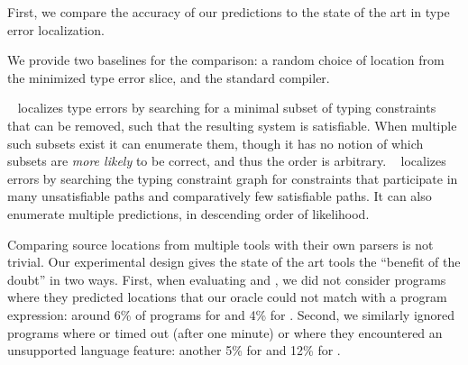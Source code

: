 \label{sec:nate:quantitative}

First, we compare the accuracy of our predictions to the
state of the art in type error localization.

We provide two baselines for the comparison: a random choice of location
from the minimized type error slice, and the standard \ocaml compiler.

\mycroft~\citep{Loncaric2016-uk} localizes type errors by searching for
a minimal subset of typing constraints that can be removed, such that
the resulting system is satisfiable.
%
When multiple such subsets exist it can enumerate them, though it has no
notion of which subsets are \emph{more likely} to be correct, and thus
the order is arbitrary.
%
\sherrloc~\citep{Zhang2014-lv} localizes errors by searching the typing
constraint graph for constraints that participate in many unsatisfiable
paths and comparatively few satisfiable paths.
%
It can also enumerate multiple predictions, in descending order of
likelihood.

Comparing source locations from multiple tools with their own parsers is
not trivial.
%
Our experimental design gives the state of the art tools the ``benefit
of the doubt'' in two ways.
First, when evaluating \mycroft and \sherrloc, we did not consider
programs where they predicted locations that our oracle could not match
with a program expression: around 6\% of programs for \mycroft and 4\%
for \sherrloc.
%
Second, we similarly ignored programs where \mycroft or \sherrloc timed
out (after one minute) or where they encountered an unsupported language
feature: another 5\% for \mycroft and 12\% for \sherrloc.
%

